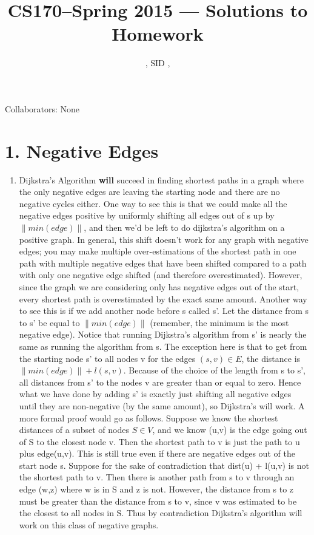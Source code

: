 \documentclass[11pt]{article}
\title{CS170--Spring 2015 --- Solutions to Homework \Homework}
\author{\Name, SID \SID, \texttt{\Login}}
\date{}
\newenvironment{qparts}{\begin{enumerate}[{(}a{)}]}{\end{enumerate}}
\begin{document}
\maketitle

Collaborators:  None

\section*{1. Negative Edges}
\begin{qparts}
\item Dijkstra's Algorithm \textbf{will} succeed in finding shortest paths in a graph where the only negative edges are leaving the starting node and there are no negative cycles either. One way to see this is that we could make all the negative edges positive by uniformly shifting all edges out of s up by $\|min(edge)\|$, and then we'd be left to do dijkstra's algorithm on a positive graph. In general, this shift doesn't work for any graph with negative edges; you may make multiple over-estimations of the shortest path in one path with multiple negative edges that have been shifted compared to a path with only one negative edge shifted (and therefore overestimated). However, since the graph we are considering only has negative edges out of the start, every shortest path is overestimated by the exact same amount. Another way to see this is if we add another node before s called s'. Let the distance from s to s' be equal to $\|min(edge)\|$ (remember, the minimum is the most negative edge). Notice that running Dijkstra's algorithm from s' is nearly the same as running the algorithm from s. The exception here is that to get from the starting node s' to all nodes v for the edges $(s,v)\in E$, the distance is $\|min(edge)\|+l(s,v)$. Because of the choice of the length from s to s', all distances from s' to the nodes v are greater than or equal to zero. Hence what we have done by adding s' is exactly just shifting all negative edges until they are non-negative (by the same amount), so Dijkstra's will work. A more formal proof would go as follows. Suppose we know the shortest distances of a subset of nodes $S\in V$, and we know (u,v) is the edge going out of S to the closest node v. Then the shortest path to v is just the path to u plus edge(u,v). This is still true even if there are negative edges out of the start node s. Suppose for the sake of contradiction that dist(u) + l(u,v) is not the shortest path to v. Then there is another path from s to v through an edge (w,z) where w is in S and z is not. However, the distance from s to z must be greater than the distance from s to v, since v was estimated to be the closest to all nodes in S. Thus by contradiction Dijkstra's algorithm will work on this class of negative graphs.

\end{qparts}
\end{document}
